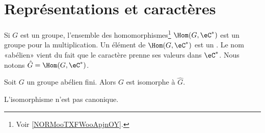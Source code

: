 
\section{Représentations et caractères}

\begin{definition}
	Si \( G\) est un groupe, l'ensemble des homomorphismes\footnote{Voir \ref{NORMooTXFWooApjnOY}.} \( \Hom(G,\eC^*)\) est un groupe pour la multiplication. Un élément de \( \Hom(G,\eC^*)\) est un . Le nom «abélien» vient du fait que le caractère prenne ses valeurs dans \( \eC^*\). Nous notons \( \hat G=\Hom(G,\eC^*)\).
\end{definition}

\begin{theorem}
	Soit \( G\) un groupe abélien fini. Alors \( G\) est isomorphe à \( \hat G\).
\end{theorem}
L'isomorphisme n'est pas canonique.

